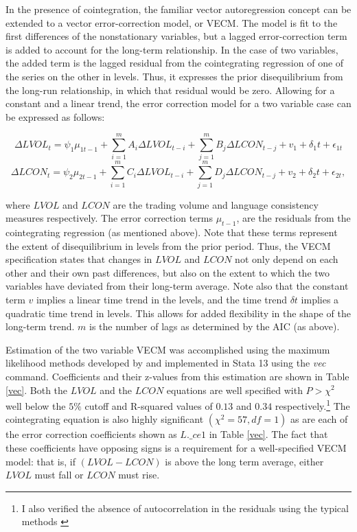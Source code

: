 In the presence of cointegration, the familiar vector autoregression concept \citep[see e.g.][]{trusov2009} can be extended to a vector error-correction model, or VECM. The model is fit to the first differences of the nonstationary variables, but a lagged error-correction term is added to account for the long-term relationship. In the case of two variables, the added term is the lagged residual from the cointegrating regression of one of the series on the other in levels. Thus, it expresses the prior disequilibrium from the long-run relationship, in which that residual would be zero. Allowing for a constant and a linear trend, the error correction model for a two variable case can be expressed as follows:

\begin{equation}
	\Delta LVOL_t = \psi_1\mu_{1t-1}+\sum_{i=1}^mA_i\Delta LVOL_{t-i} + \sum_{j=1}^mB_j\Delta LCON_{t-j}+v_1+\delta_1 t+\epsilon_{1t}
\end{equation}
\begin{equation}
	\Delta LCON_t = \psi_2\mu_{2t-1}+\sum_{i=1}^mC_i\Delta LVOL_{t-i} + \sum_{j=1}^mD_j\Delta LCON_{t-j}+v_2+\delta_2 t+\epsilon_{2t},
\end{equation}

\noindent where $LVOL$ and $LCON$ are the trading volume and language consistency measures respectively. The error correction terms $\mu_{t-1}$, are the residuals from the cointegrating regression (as mentioned above). Note that these terms represent the extent of disequilibrium in levels from the prior period. Thus, the VECM specification states that changes in $LVOL$ and $LCON$ not only depend on each other and their own past differences, but also on the extent to which the two variables have deviated from their long-term average. Note also that the constant term $v$ implies a linear time trend in the levels, and the time trend $\delta t$ implies a quadratic time trend in levels. This allows for added flexibility in the shape of the long-term trend. $m$ is the number of lags as determined by the AIC (as above).

Estimation of the two variable VECM was accomplished using the maximum likelihood methods developed by \citet{johansen1995} and implemented in Stata 13 using the \emph{vec} command. Coefficients and their z-values from this estimation are shown in Table \ref{vec}. Both the $LVOL$ and the $LCON$ equations are well specified with $P>\chi^2$ well below the $5\%$ cutoff and R-squared values of $0.13$ and $0.34$ respectively.\footnote{I also verified the absence of autocorrelation in the residuals using the typical methods \citep[see e.g.][]{trusov2009}} The cointegrating equation is also highly significant $(\chi^2 = 57, df=1)$ as are each of the error correction coefficients shown as $L.\_ce1$ in Table \ref{vec}. The fact that these coefficients have opposing signs is a requirement for a well-specified VECM model: that is, if $(LVOL-LCON)$ is above the long term average, either $LVOL$ must fall or $LCON$ must rise. 

